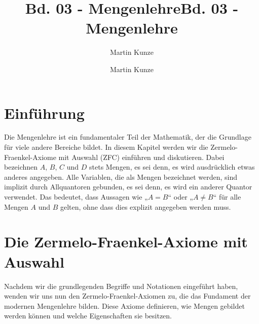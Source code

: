 \documentclass[main.tex]{subfiles}
\title{Bd. 03 - Mengenlehre}
\author{Martin Kunze}
\date{}
\begin{document}
\title{Bd. 03 - Mengenlehre}
\author{Martin Kunze}
\date{}
\hypersetup{pageanchor=false}
\maketitle
\hypersetup{pageanchor=true}
\setcounter{tocdepth}{3}
\tableofcontents
\setcounter{file}{3}
\renewcommand{\FormulaBandID}{3}


\chapter{Einführung}

Die Mengenlehre ist ein fundamentaler Teil der Mathematik, der die Grundlage für viele andere Bereiche bildet. In diesem Kapitel werden wir die Zermelo-Fraenkel-Axiome mit Auswahl (ZFC) einführen und diskutieren. Dabei bezeichnen \( A \), \( B \), \( C \) und \( D \) stets Mengen, es sei denn, es wird ausdrücklich etwas anderes angegeben. Alle Variablen, die als Mengen bezeichnet werden, sind implizit durch Allquantoren gebunden, es sei denn, es wird ein anderer Quantor verwendet. Das bedeutet, dass Aussagen wie „\( A = B \)“ oder „\( A \neq B \)“ für alle Mengen \( A \) und \( B \) gelten, ohne dass dies explizit angegeben werden muss.

\chapter{Die Zermelo-Fraenkel-Axiome mit Auswahl}

Nachdem wir die grundlegenden Begriffe und Notationen eingeführt haben, wenden wir uns nun den Zermelo-Fraenkel-Axiomen zu, die das Fundament der modernen Mengenlehre bilden. Diese Axiome definieren, wie Mengen gebildet werden können und welche Eigenschaften sie besitzen.
\end{document}
